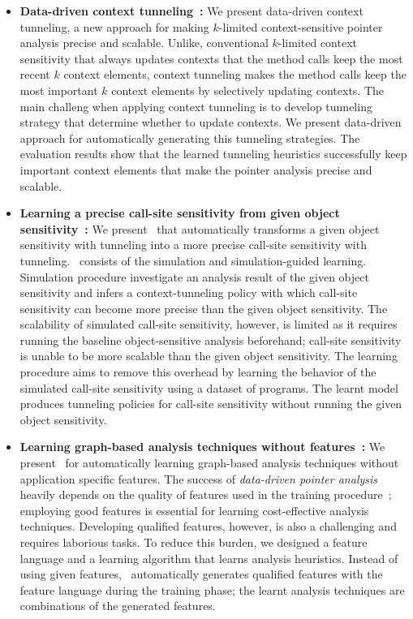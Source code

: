 \begin{itemize}
\item {\bf Data-driven context tunneling~\cite{JeJeOh18}:}
  We present data-driven context tunneling, a new approach for making $k$-limited context-sensitive pointer analysis precise and scalable.
  Unlike, conventional $k$-limited context sensitivity that always updates contexts that the method calls keep the most recent $k$ context elements, context tunneling makes the method calls keep the most important $k$ context elements by selectively updating contexts.
  The main challeng when applying context tunneling is to develop tunneling strategy that determine whether to update contexts. We present data-driven approach for automatically generating this tunneling strategies. The evaluation results show that the learned tunneling heuristics successfully keep important context elements that make the pointer analysis precise and scalable.


\item {\bf Learning a precise call-site sensitivity from given object sensitivity~\cite{JeOh22}:}
We present \ourtechnique~that automatically transforms a given object sensitivity with tunneling into a more precise call-site sensitivity with tunneling. 
\ourtechnique~consists of the simulation and
simulation-guided learning.  
Simulation procedure investigate an analysis result of the given object sensitivity and infers a context-tunneling policy
with which call-site sensitivity can become more precise than the given object sensitivity.
The scalability of simulated call-site sensitivity, however, is 
limited as it requires running the baseline object-sensitive
analysis beforehand; call-site sensitivity is unable to be more scalable than the given object sensitivity.
The learning procedure aims to remove
this overhead by learning the behavior of the simulated call-site sensitivity using
a dataset of programs. 
The learnt model produces tunneling policies for call-site sensitivity without running the given object sensitivity.



\item {\bf Learning graph-based analysis techniques without features~\cite{Graphick20}:}
We present \ourtool~for automatically learning graph-based analysis techniques without application specific features.
The success of {\em data-driven pointer analysis} heavily depends on the quality of features used in the training procedure~\cite{JeJeChOh17,ChOhHeYa17}; 
employing good features is essential for learning cost-effective analysis techniques.
Developing qualified features, however, is also a challenging and requires laborious tasks.
To reduce this burden, we designed a feature language and a learning algorithm that learns analysis heuristics. 
Instead of using given features, \ourtool~automatically generates qualified features with the feature language during the training phase; the learnt analysis techniques are combinations of the generated features. 



\end{itemize}


